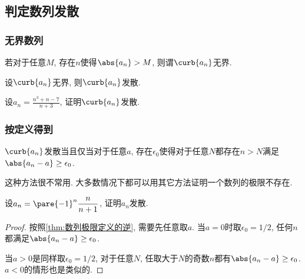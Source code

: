 \documentclass{ctexart}
\begin{document}


\subsection{判定数列发散} %
\label{sub:判定数列发散}

\subsubsection{无界数列} %
\label{ssub:无界数列}

\begin{definition}[无界数列]
    若对于任意$M$, 存在$n$使得$\abs{a_n} > M$, 则谓$\curb{a_n}$无界.
\end{definition}
\begin{theorem}[无界数列发散]
    设$\curb{a_n}$无界, 则$\curb{a_n}$发散.
\end{theorem}
\begin{sample}
    \begin{ex}
        设$\displaystyle a_n = \frac{n^3+n-7}{n+3}$, 证明$\curb{a_n}$发散.
    \end{ex}
\end{sample}


\subsubsection{按定义得到} %
\label{ssub:按定义得到}

\begin{theorem}
    \label{thm:数列极限定义的逆}
    $\curb{a_n}$发散当且仅当对于任意$a$, 存在$\epsilon_0$使得对于任意$N$都存在$n>N$满足$\abs{a_n-a} \ge \epsilon_0$.
\end{theorem}
这种方法很不常用. 大多数情况下都可以用其它方法证明一个数列的极限不存在.
\begin{sample}
    \begin{ex}
        设$\displaystyle a_n = \pare{-1}^n\frac{n}{n+1}$, 证明$a_n$发散.
    \end{ex}
    \begin{proof}
        按照\cref{thm:数列极限定义的逆}, 需要先任意取$a$. 当$a=0$时取$\epsilon_0 = 1/2$, 任何$n$都满足$\abs{a_n-a} \ge \epsilon_0$.
        \par
        当$a>0$是同样取$\epsilon_0 = 1/2$, 对于任意$N$, 任取大于$N$的奇数$n$都有$\abs{a_n-a} \ge \epsilon_0$. $a<0$的情形也是类似的.
    \end{proof}
\end{sample}
\end{document}
